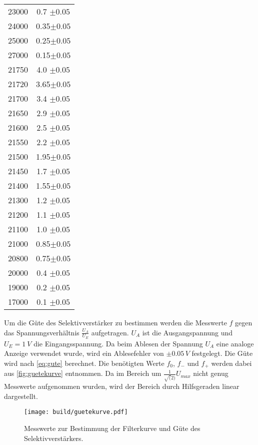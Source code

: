 \begin{table}[H]
\begin{tabular}{c c}
      23000 & 0.7 $\pm 0.05$\\
      24000 & 0.35$\pm 0.05$ \\
      25000 & 0.25$\pm 0.05$ \\
      27000 & 0.15$\pm 0.05$ \\
      21750 & 4.0 $\pm 0.05$\\
      21720 & 3.65$\pm 0.05$ \\
      21700 & 3.4 $\pm 0.05$\\
      21650 & 2.9 $\pm 0.05$\\
      21600 & 2.5 $\pm 0.05$\\
      21550 & 2.2 $\pm 0.05$\\
      21500 & 1.95$\pm 0.05$ \\
      21450 & 1.7 $\pm 0.05$\\
      21400 & 1.55$\pm 0.05$ \\
      21300 & 1.2 $\pm 0.05$\\
      21200 & 1.1 $\pm 0.05$\\
      21100 & 1.0 $\pm 0.05$\\
      21000 & 0.85$\pm 0.05$ \\
      20800 & 0.75$\pm 0.05$ \\
      20000 & 0.4 $\pm 0.05$\\
      19000 & 0.2 $\pm 0.05$\\
      17000 & 0.1 $\pm 0.05$\\
      \bottomrule
  \end{tabular}
  \label{tab:guete}
\end{table}

Um die Güte des Selektivverstärker zu bestimmen werden die Messwerte $f$ gegen das Spannungsverhältnis $\frac{U_A}{U_E}$ aufgetragen. $U_A$ ist die 
Ausgangspannung und $U_E = \SI{1}{V}$ die Eingangsspannung. Da beim Ablesen der Spannung $U_A$ eine analoge Anzeige verwendet wurde, wird ein Ablesefehler von $\pm 0.05\,\unit{V}$ festgelegt.
Die Güte wird nach \autoref{eq:gute} berechnet. 
Die benötigten Werte $f_0$, $f_{-}$ und $f_{+}$ werden dabei aus \autoref{fig:guetekurve} entnommen. Da im Bereich um $\frac{1}{\sqrt(2)}U_{max}$ nicht genug Messwerte
aufgenommen wurden, wird der Bereich durch Hilfsgeraden linear dargestellt.

\begin{figure}[H]
  \centering
  \texttt{[image: build/guetekurve.pdf]}
  \caption{Messwerte zur Bestimmung der Filterkurve und Güte des Selektivverstärkers.}
  \label{fig:guetekurve}
\end{figure}

